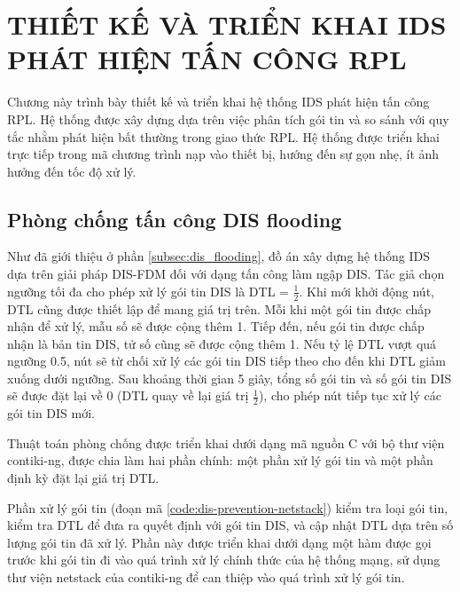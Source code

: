 \section{THIẾT KẾ VÀ TRIỂN KHAI IDS PHÁT HIỆN TẤN CÔNG RPL}
\label{sec:ch4}

Chương này trình bày thiết kế và triển khai hệ thống IDS phát hiện tấn công RPL. Hệ thống được xây dựng dựa trên việc phân tích gói tin và so sánh với quy tắc nhằm phát hiện bất thường trong giao thức RPL. Hệ thống được triển khai trực tiếp trong mã chương trình nạp vào thiết bị, hướng đến sự gọn nhẹ, ít ảnh hưởng đến tốc độ xử lý.

\subsection{Phòng chống tấn công DIS flooding}
\label{prevention:dis-flooding}

Như đã giới thiệu ở phần \ref{subsec:dis_flooding}, đồ án xây dựng hệ thống IDS dựa trên giải pháp DIS-FDM đối với dạng tấn công làm ngập DIS. Tác giả chọn ngưỡng tối đa cho phép xử lý gói tin DIS là DTL = $\frac{1}{2}$. Khi mới khởi động nút, DTL cũng được thiết lập để mang giá trị trên. Mỗi khi một gói tin được chấp nhận để xử lý, mẫu số sẽ được cộng thêm 1. Tiếp đến, nếu gói tin được chấp nhận là bản tin DIS, tử số cũng sẽ được cộng thêm 1. Nếu tỷ lệ DTL vượt quá ngưỡng 0.5, nút sẽ từ chối xử lý các gói tin DIS tiếp theo cho đến khi DTL giảm xuống dưới ngưỡng. Sau khoảng thời gian 5 giây, tổng số gói tin và số gói tin DIS sẽ được đặt lại về 0 (DTL quay về lại giá trị $\frac{1}{2}$), cho phép nút tiếp tục xử lý các gói tin DIS mới.

Thuật toán phòng chống được triển khai dưới dạng mã nguồn C với bộ thư viện contiki-ng, được chia làm hai phần chính: một phần xử lý gói tin và một phần định kỳ đặt lại giá trị DTL. 

Phần xử lý gói tin (đoạn mã \ref{code:dis-prevention-netstack}) kiểm tra loại gói tin, kiểm tra DTL để đưa ra quyết định với gói tin DIS, và cập nhật DTL dựa trên số lượng gói tin đã xử lý. Phần này được triển khai dưới dạng một hàm được gọi trước khi gói tin đi vào quá trình xử lý chính thức của hệ thống mạng, sử dụng thư viện netstack của contiki-ng để can thiệp vào quá trình xử lý gói tin.

\label{code:dis-prevention-netstack}

